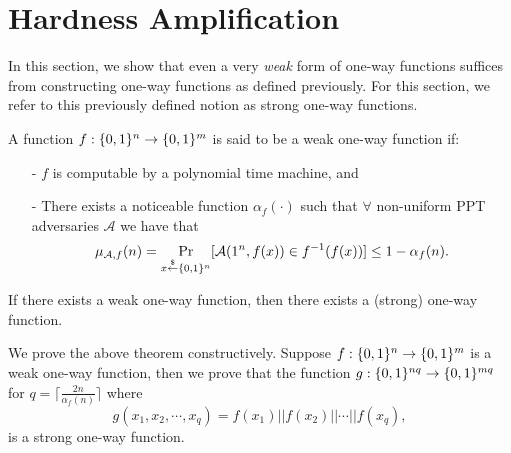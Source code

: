 \section{Hardness Amplification}
\label{sec:owf:amplify}
In this section, we show that even a very \emph{weak} form of one-way functions suffices from constructing one-way functions as defined previously. For this section, we refer to this previously defined notion as strong one-way functions.
\begin{definition}
A function $f : \{0,1\}^{n} \rightarrow \{0,1\}^{m}$ is said to be a weak one-way function if:
\begin{itemize}
\item[-] $f$ is computable by a polynomial time machine, and
\item[-] There exists a noticeable function $\alpha_f(\cdot)$ such that $\forall$ non-uniform PPT adversaries $\mathcal{A}$ we have that
    $$
    \mu_{\mathcal{A},f}(n) =
    \Pr_{x \stackrel{\$}{\leftarrow} \{0,1\}^{n}}[ \mathcal{A}(1^n, f(x)) \in f^{-1}(f(x))] \leq 1 - \alpha_{f}(n).
    $$
\end{itemize}
\end{definition}

\begin{theorem}\label{theorem:weakstrongOWF}
If there exists a weak one-way function, then there exists a (strong) one-way function.
\end{theorem}

\proof We prove the above theorem constructively. Suppose $f : \{0,1\}^{n} \rightarrow \{0,1\}^{m}$ is a weak one-way function, then we prove that the function $g: \{0,1\}^{nq} \rightarrow \{0,1\}^{mq}$ for $q = \lceil \frac{2n}{\alpha_{f}(n)} \rceil$ where 
$$g(x_1, x_2, \cdots, x_q) = f(x_1) || f(x_2) || \cdots || f(x_q),$$
 is a strong one-way function.


